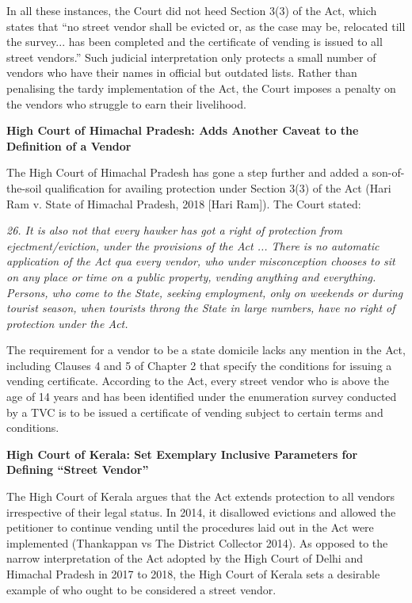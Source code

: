 \documentclass[a4paper, 12pt, twoside]{article}
\begin{document}
{In all these instances, the Court did not heed Section 3(3) of the Act, which states that “no street vendor shall be evicted or, as the case may be, relocated till the survey... has been completed and the certificate of vending is issued to all street vendors.” Such judicial interpretation only protects a small number of vendors who have their names in official but outdated lists. Rather than penalising the tardy implementation of the Act, the Court imposes a penalty on the vendors who struggle to earn their livelihood.

\textbf{High Court of Himachal Pradesh: Adds Another Caveat to the Definition of a Vendor}

The High Court of Himachal Pradesh has gone a step further and added a son-of-the-soil qualification for availing protection under Section 3(3) of the Act (Hari Ram v. State of Himachal Pradesh, 2018 [Hari Ram]). The Court stated:

\textit{26. It is also not that every hawker has got a right of protection from ejectment/eviction, under the provisions of the Act ... There is no automatic application of the Act qua every vendor, who under misconception chooses to sit on any place or time on a public property, vending anything and everything. Persons, who come to the State, seeking employment, only on weekends or during tourist season, when tourists throng the State in large numbers, have no right of protection under the Act.}

The requirement for a vendor to be a state domicile lacks any mention in the Act, including Clauses 4 and 5 of Chapter 2 that specify the conditions for issuing a vending certificate. According to the Act, every street vendor who is above the age of 14 years and has been identified under the enumeration survey conducted by a TVC is to be issued a certificate of vending subject to certain terms and conditions.

\textbf{High Court of Kerala: Set Exemplary Inclusive Parameters for Defining “Street Vendor”}

The High Court of Kerala argues that the Act extends protection to all vendors irrespective of their legal status. In 2014, it disallowed evictions and allowed the petitioner to continue vending until the procedures laid out in the Act were implemented (Thankappan vs The District Collector 2014). As opposed to the narrow interpretation of the Act adopted by the High Court of Delhi and Himachal Pradesh in 2017 to 2018, the High Court of Kerala sets a desirable example of who ought to be considered a street vendor.

}
\end{document}
